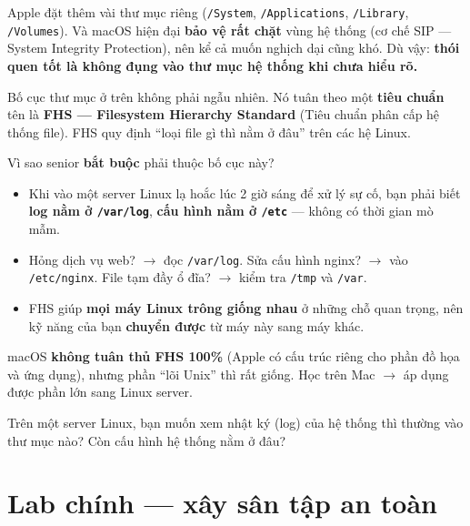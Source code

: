 \documentclass[12pt,a4paper]{article}
\begin{document}
\begin{notebox}[title={Lưu ý macOS}]
Apple đặt thêm vài thư mục riêng (\texttt{/System}, \texttt{/Applications}, \texttt{/Library}, \texttt{/Volumes}). Và macOS hiện đại \textbf{bảo vệ rất chặt} vùng hệ thống (cơ chế SIP --- System Integrity Protection), nên kể cả muốn nghịch dại cũng khó. Dù vậy: \textbf{thói quen tốt là không đụng vào thư mục hệ thống khi chưa hiểu rõ.}
\end{notebox}

\begin{seniorbox}[title={Góc Senior \#3 --- FHS (Filesystem Hierarchy Standard)}]
Bố cục thư mục ở trên không phải ngẫu nhiên. Nó tuân theo một \textbf{tiêu chuẩn} tên là \textbf{FHS --- Filesystem Hierarchy Standard} (Tiêu chuẩn phân cấp hệ thống file). FHS quy định ``loại file gì thì nằm ở đâu'' trên các hệ Linux.

Vì sao senior \textbf{bắt buộc} phải thuộc bố cục này?
\begin{itemize}[leftmargin=*]
  \item Khi vào một server Linux lạ hoắc lúc 2 giờ sáng để xử lý sự cố, bạn phải biết \textbf{log nằm ở \texttt{/var/log}}, \textbf{cấu hình nằm ở \texttt{/etc}} --- không có thời gian mò mẫm.
  \item Hỏng dịch vụ web? $\rightarrow$ đọc \texttt{/var/log}. Sửa cấu hình nginx? $\rightarrow$ vào \texttt{/etc/nginx}. File tạm đầy ổ đĩa? $\rightarrow$ kiểm tra \texttt{/tmp} và \texttt{/var}.
  \item FHS giúp \textbf{mọi máy Linux trông giống nhau} ở những chỗ quan trọng, nên kỹ năng của bạn \textbf{chuyển được} từ máy này sang máy khác.
\end{itemize}

macOS \textbf{không tuân thủ FHS 100\%} (Apple có cấu trúc riêng cho phần đồ họa và ứng dụng), nhưng phần ``lõi Unix'' thì rất giống. Học trên Mac $\rightarrow$ áp dụng được phần lớn sang Linux server.
\end{seniorbox}

\begin{checkbox}[title={Tự kiểm tra 5}]
Trên một server Linux, bạn muốn xem nhật ký (log) của hệ thống thì thường vào thư mục nào? Còn cấu hình hệ thống nằm ở đâu?
\end{checkbox}

\section{Lab chính --- xây sân tập an toàn}
\end{document}
